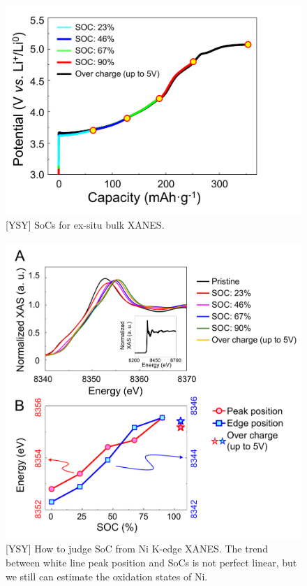 \documentclass{article}
\begin{document}
\begin{figure}
  \includegraphics[width=\textwidth]{figures/ys-echem.png}
  \caption{[YSY] SoCs for ex-situ bulk XANES.}
\end{figure}

\begin{figure}
  \includegraphics[width=\textwidth]{figures/ys-xanes.png}
  \caption{[YSY] How to judge SoC from Ni K-edge XANES. The trend between
    white line peak position and SoCs is not perfect linear, but we
    still can estimate the oxidation states of Ni.}
\end{figure}
\end{document}
